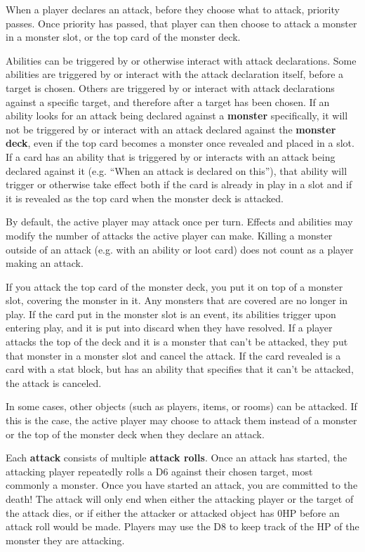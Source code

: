 \documentclass[a4paper, twoside]{report} %
\begin{document}
    When a player declares an attack, before they choose what to attack, priority passes. Once priority has passed, that player can then choose to attack a monster in a monster slot, or the top card of the monster deck.

    Abilities can be triggered by or otherwise interact with attack declarations. Some abilities are triggered by or interact with the attack declaration itself, before a target is chosen. Others are triggered by or interact with attack declarations against a specific target, and therefore after a target has been chosen. If an ability looks for an attack being declared against a \textbf{monster} specifically, it will not be triggered by or interact with an attack declared against the \textbf{monster deck}, even if the top card becomes a monster once revealed and placed in a slot. If a card has an ability that is triggered by or interacts with an attack being declared against it (e.g. “When an attack is declared on this”), that ability will trigger or otherwise take effect both if the card is already in play in a slot and if it is revealed as the top card when the monster deck is attacked.

    By default, the active player may attack once per turn. Effects and abilities may modify the number of attacks the active player can make. Killing a monster outside of an attack (e.g. with an ability or loot card) does not count as a player making an attack.

    If you attack the top card of the monster deck, you put it on top of a monster slot, covering the monster in it. Any monsters that are covered are no longer in play. If the card put in the monster slot is an event, its abilities trigger upon entering play, and it is put into discard when they have resolved. If a player attacks the top of the deck and it is a monster that can’t be attacked, they put that monster in a monster slot and cancel the attack. If the card revealed is a card with a stat block, but has an ability that specifies that it can’t be attacked, the attack is canceled.

    In some cases, other objects (such as players, items, or rooms) can be attacked. If this is the case, the active player may choose to attack them instead of a monster or the top of the monster deck when they declare an attack.

    Each \textbf{attack} consists of multiple \textbf{attack rolls}. Once an attack has started, the attacking player repeatedly rolls a D6 against their chosen target, most commonly a monster. Once you have started an attack, you are committed to the death! The attack will only end when either the attacking player or the target of the attack dies, or if either the attacker or attacked object has 0HP before an attack roll would be made. Players may use the D8 to keep track of the HP of the monster they are attacking.
\end{document}
